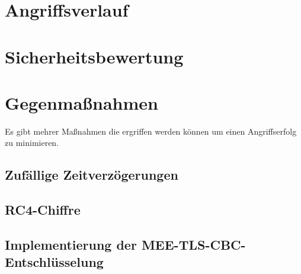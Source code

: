 \documentclass[a4paper,11pt]{scrartcl}
\begin{document}
    \section{Angriffsverlauf}\label{sec:angriffsverlauf}


    \section{Sicherheitsbewertung}\label{sec:sicherheitsbewertung}


    \section{Gegenmaßnahmen}\label{sec:gegenmanahmen}
    Es gibt mehrer Maßnahmen die ergriffen werden können um einen Angriffserfolg zu minimieren.

    \subsection{Zufällige Zeitverzögerungen}

    \subsection{RC4-Chiffre}

    \subsection{Implementierung der MEE-TLS-CBC-Entschlüsselung}
    \newpage

    
\end{document}
